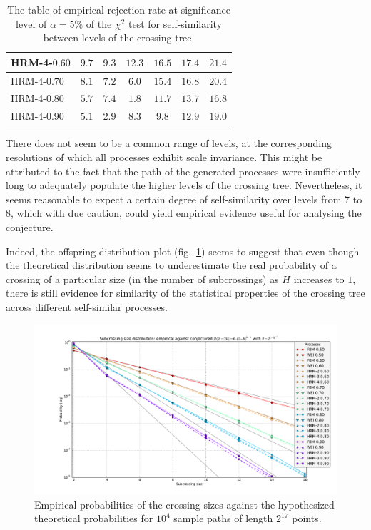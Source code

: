 \documentclass[a4paper]{article}
\begin{document}
\begin{table}[h]
\begin{center}
\begin{tabular}{l||c|c|c|c|c|c|}
	HRM-4-$0.60$ 	& $9.7$ &  $\mathbf{9.3}$ & $12.3$ & $16.5$ & $17.4$ & $21.4$ \\ \hline
	HRM-4-$0.70$ 	& $8.1$ &  $7.2$ &  $\mathbf{6.0}$ & $15.4$ & $16.8$ & $20.4$ \\ \hline
	HRM-4-$0.80$ 	& $5.7$ &  $7.4$ &  $\mathbf{1.8}$ & $11.7$ & $13.7$ & $16.8$ \\ \hline
	HRM-4-$0.90$ 	& $5.1$ &  $\mathbf{2.9}$ &  $8.3$ &  $9.8$ & $12.9$ & $19.0$ \\ \hline\hline

 	\end{tabular}
	\caption{The table of empirical rejection rate at significance level of $\alpha = 5\%$
	of the $\chi^2$ test for self-similarity between levels of the crossing tree. }
\label{tbl:chi_sq_test_for_all_01}
\end{center}\end{table}
There does not seem to be a common range of levels, at the corresponding resolutions of which
all processes exhibit scale invariance. This might be attributed to the fact that the path
of the generated processes were insufficiently long to adequately populate the higher
levels of the crossing tree. Nevertheless, it seems reasonable to expect a certain degree
of self-similarity over levels from 7 to 8, which with due caution, could yield empirical
evidence useful for analysing the conjecture.

Indeed, the offspring distribution plot (fig.~\ref{fig:all_xing_probs}) seems to
suggest that even though the theoretical distribution seems to underestimate the real
probability of a crossing of a particular size (in the number of subcrossings) as $H$
increases to $1$, there is still evidence for similarity of the statistical properties
of the crossing tree across different self-similar processes.
\begin{figure}[htb]\begin{center}
    \includegraphics[width=6in]{images/fig_02_med_10000-17}
    \caption{Empirical probabilities of the crossing sizes against the hypothesized
    theoretical probabilities for $10^4$ sample paths of length $2^{17}$ points.}
\label{fig:all_xing_probs}
\end{center}\end{figure}
\end{document}
